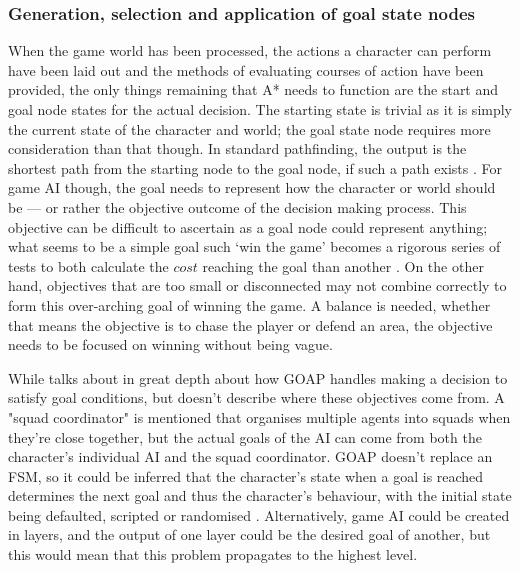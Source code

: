 \documentclass[11pt, a4paper]{article}
\begin{document}
\subsubsection{Generation, selection and application of goal state nodes}

When the game world has been processed, the actions a character can perform have been laid out and the methods of evaluating courses of action have been provided, the only things remaining that A* needs to function are the start and goal node states for the actual decision. The starting state is trivial as it is simply the current state of the character and world; the goal state node requires more consideration than that though. In standard pathfinding, the output is the shortest path from the starting node to the goal node, if such a path exists \parencite[61]{nareyek2004ai}. For game AI though, the goal needs to represent how the character or world should be --- or rather the objective outcome of the decision making process. This objective can be difficult to ascertain as a goal node could represent anything; what seems to be a simple goal such `win the game' becomes a rigorous series of tests to both calculate the $cost$ reaching the goal than another \parencite[403]{harmon2002economic}. On the other hand, objectives that are too small or disconnected may not combine correctly to form this over-arching goal of winning the game. A balance is needed, whether that means the objective is to chase the player or defend an area, the objective needs to be focused on winning without being vague.

While \citeauthor{orkin2003applying} \parencite*{orkin2003applying} talks about in great depth about how GOAP handles making a decision to satisfy goal conditions, but doesn't describe where these objectives come from. A "squad coordinator" is mentioned \parencite[13]{orkin2003applying} that organises multiple agents into squads when they're close together, but the actual goals of the AI can come from both the character's individual AI and the squad coordinator. GOAP doesn't replace an FSM, so it could be inferred that the character's state when a goal is reached determines the next goal and thus the character's behaviour, with the initial state being defaulted, scripted or randomised \parencite[2]{orkin2003applying}. Alternatively, game AI could be created in layers, and the output of one layer could be the desired goal of another, but this would mean that this problem propagates to the highest level. 
\end{document}
